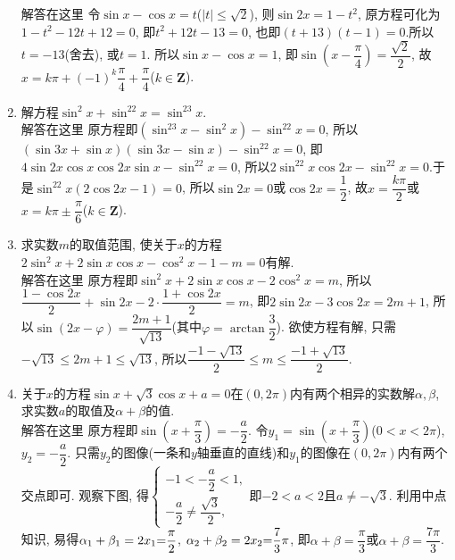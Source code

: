 \documentclass[10pt,a4paper]{article}
\begin{document}
\begin{enumerate}[1.]
解答在这里  令$\sin x-\cos x=t$($|t|\le \sqrt 2$), 则$\sin 2x=1-t^2$, 原方程可化为$1-t^2-12t+12=0$,
即$t^2+12t-13=0$, 也即$(t+13)(t-1)=0$.所以$t=-13$(舍去), 或$t=1$.
所以$\sin x-\cos x=1$, 即$\sin (x-\dfrac{\pi }4)=\dfrac{\sqrt 2}2$, 故$x=k\pi +(-1)^k\dfrac{\pi }4+\dfrac{\pi }4$($k\in \mathbf{Z}$).
\item 解方程$\sin ^2x+\sin ^22x=\sin ^23x$.\\
解答在这里  原方程即$(\sin ^23x-\sin ^2x)-\sin ^22x=0$,
所以$(\sin 3x+\sin x)(\sin 3x-\sin x)-\sin ^22x=0$, 即$4\sin 2x\cos x\cos 2x\sin x-\sin ^22x=0$,
所以$2\sin ^22x\cos 2x-\sin ^22x=0$.于是$\sin ^22x(2\cos 2x-1)=0$,
所以$\sin 2x=0$或$\cos 2x=\dfrac 12$, 故$x=\dfrac{k\pi }2$或$x=k\pi \pm \dfrac{\pi }6$($k\in \mathbf{Z}$).
\item 求实数$m$的取值范围, 使关于$x$的方程$2\sin ^2x+2\sin x\cos x-\cos ^2x-1-m=0$有解.\\
解答在这里  原方程即$\sin ^2x+2\sin x\cos x-2\cos ^2x=m$, 所以$\dfrac{1-\cos 2x}2+\sin 2x-2\cdot \dfrac{1+\cos 2x}2=m$,
即$2\sin 2x-3\cos 2x=2m+1$, 所以$\sin (2x-\varphi)=\dfrac{2m+1}{\sqrt {13}}$(其中$\varphi =\arctan \dfrac 32$).
欲使方程有解, 只需$-\sqrt {13}\le 2m+1\le \sqrt {13}$, 所以$\dfrac{-1-\sqrt {13}}2\le m\le \dfrac{-1+\sqrt {13}}2$.
\item 关于$x$的方程$\sin x+\sqrt 3\cos x+a=0$在$(0,2\pi)$内有两个相异的实数解$\alpha ,\beta$, 求实数$a$的取值及$\alpha +\beta$的值.\\
解答在这里  原方程即$\sin (x+\dfrac{\pi }3)=-\dfrac a2$.
令$y_1=\sin (x+\dfrac{\pi }3)$($0<x<2\pi$), $y_2=-\dfrac a2$.
只需$y_2$的图像(一条和$y$轴垂直的直线)和$y_1$的图像在$(0,2\pi)$内有两个交点即可.
观察下图, 得$\begin{cases} -1<-\dfrac a2<1, \\ -\dfrac a2\ne \dfrac{\sqrt 3}2, \end{cases}$即$-2<a<2$且$a\ne -\sqrt 3$.
利用中点知识, 易得$\alpha _1+\beta _1=2x_1\text=\dfrac{\pi }2$, $\alpha _2+\beta _2=2x_2\text=\dfrac 73\pi$, 即$\alpha +\beta =\dfrac{\pi }3$或$\alpha +\beta =\dfrac{7\pi }3$.
\begin{center}
\end{center}
\end{enumerate}
\end{document}
